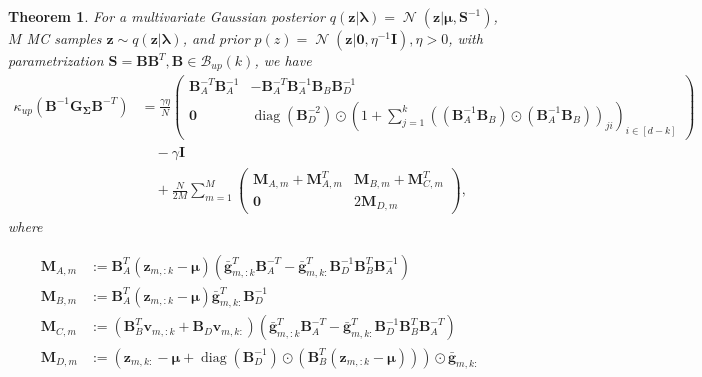 \documentclass[a4paper, 11pt, oneside]{scrartcl}
\theoremstyle{break}
\newtheorem{theorem}[lemma]{Theorem}
\DeclareMathOperator{\Normal}{\mathcal{N}}
\DeclareMathOperator{\diag}{diag}
\newcommand{\matr}[1]{\boldsymbol{#1}}
\newcommand{\set}[1]{\mathcal{#1}}
\numberwithin{equation}{section}
\begin{document}
					\begin{theorem}
						For a multivariate Gaussian posterior $q(\matr{z} | \matr{\lambda}) = \Normal(\matr{z} | \matr{\mu}, \matr{S}^{-1})$, $M$ MC samples $\matr{z} \sim q(\matr{z} | \matr{\lambda})$, and prior $p(z) = \Normal(\matr{z} | \matr{0}, \eta^{-1} \matr{I}), \eta > 0$, with parametrization $\matr{S} = \matr{B} \matr{B}^T, \matr{B} \in \set{B}_{up}(k)$, we have
						\begin{align*}
							\kappa_{up}(\matr{B}^{-1} \matr{G_{\Sigma}} \matr{B}^{-T}) &= \frac{\gamma \eta}{N}\begin{pmatrix} \matr{B}_A^{-T} \matr{B}_A^{-1} & -\matr{B}_A^{-T} \matr{B}_A^{-1} \matr{B}_B \matr{B}_D^{-1} \\ \matr{0} & \diag(\matr{B}_D^{-2}) \odot (1 + \sum_{j=1}^k ((\matr{B}_A^{-1} \matr{B}_B) \odot (\matr{B}_A^{-1} \matr{B}_B))_{ji})_{i \in [d-k]} \end{pmatrix} \\
							&\quad - \gamma \matr{I} \\
							&\quad + \frac{N}{2 M} \sum_{m=1}^M \begin{pmatrix} \matr{M}_{A, m} + \matr{M}_{A, m}^T & \matr{M}_{B, m} + \matr{M}_{C, m}^T \\ \matr{0} & 2\matr{M}_{D, m} \end{pmatrix},
						\end{align*}
						where 

						\begin{align*}
							\matr{M}_{A, m} &:= \matr{B}_A^T (\matr{z}_{m, :k} - \matr{\mu}) (\matr{\bar{g}}_{m, :k}^T \matr{B}_A^{-T} - \matr{\bar{g}}_{m, k:}^T \matr{B}_D^{-1} \matr{B}_B^T \matr{B}_A^{-1} ) \\
							\matr{M}_{B, m} &:= \matr{B}_A^T (\matr{z}_{m, :k} - \matr{\mu}) \matr{\bar{g}}_{m, k:}^T \matr{B}_D^{-1} \\
							\matr{M}_{C, m} &:= (\matr{B}_B^T \matr{v}_{m, :k} + \matr{B}_D \matr{v}_{m, k:}) (\matr{\bar{g}}_{m, :k}^T \matr{B}_A^{-T} - \matr{\bar{g}}_{m, k:}^T \matr{B}_D^{-1} \matr{B}_B^T \matr{B}_A^{-T}) \\
							\matr{M}_{D, m} &:= (\matr{z}_{m, k:} - \matr{\mu} + \diag(\matr{B}_D^{-1}) \odot (\matr{B}_B^T (\matr{z}_{m, :k} - \matr{\mu}))) \odot \matr{\bar{g}}_{m, k:}
						\end{align*}
					\end{theorem}
\end{document}
